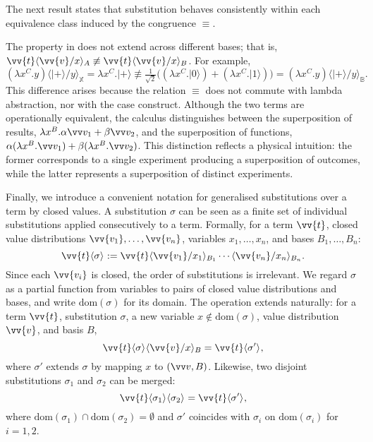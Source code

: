 \documentclass[runningheads,orivec,envcountsame,envcountsect]{llncs}
\providecommand{\qed}{\hbox{\rule{1ex}{1ex}}}%
\newcommand\ket[1]{\ensuremath{|#1\rangle}}
\newcommand\ansubst[2]{\ensuremath{\langle #1 \rangle_{#2}}}
\newcommand\dom[1]{\mathrm{dom}(#1)}
\def\Lam#1#2#3{\lambda#1^{#2}{.}#3} %
\newcommand\B{\mathbb B}
\newcommand\XB{\mathbb X}
\begin{document}
The next result states that substitution behaves consistently within each
equivalence class induced by the congruence $\equiv$.


\begin{remark}
  The property in  does not extend across
  different bases; that is,
  $\vv{t}\ansubst{\vv{v}/x}{A}\not\equiv\vv{t}\ansubst{\vv{v}/x}{B}$.
  For example,
  \[
    (\Lam{x}{C}{y})\ansubst{\ket{+}/y}{\XB}
    = \Lam{x}{C}{\ket{+}} 
    \not\equiv
    \tfrac{1}{\sqrt{2}}\big((\Lam{x}{C}{\ket{0}})
    + (\Lam{x}{C}{\ket{1}})\big)
    = (\Lam{x}{C}{y})\ansubst{\ket{+}/y}{\B}.
  \]
  This difference arises because the relation $\equiv$ does not commute with
  lambda abstraction, nor with the case construct. Although the two terms are
  operationally equivalent, the calculus distinguishes between the
  superposition of results,
  $\Lam{x}{B}{\alpha\vv v_1 + \beta\vv v_2}$,
  and the superposition of functions,
  $\alpha(\Lam{x}{B}{\vv v_1}) + \beta(\Lam{x}{B}{\vv v_2})$.
  This distinction reflects a physical intuition: the former corresponds to a
  single experiment producing a superposition of outcomes, while the latter
  represents a superposition of distinct experiments.
\end{remark}

Finally, we introduce a convenient notation for generalised substitutions over
a term by closed values. A substitution $\sigma$ can be seen as a finite set of
individual substitutions applied consecutively to a term. Formally, for a term
$\vv{t}$, closed value distributions $\vv{v_1},\dots,\vv{v_n}$, variables
$x_1,\dots,x_n$, and bases $B_1,\dots,B_n$:
\[
  \vv{t}\ansubst{\sigma}{}
  := \vv{t}\ansubst{\vv{v_1}/x_1}{B_1}\dotsb\ansubst{\vv{v_n}/x_n}{B_n}.
\]
Since each $\vv{v_i}$ is closed, the order of substitutions is irrelevant. We
regard $\sigma$ as a partial function from variables to pairs of closed value
distributions and bases, and write $\dom{\sigma}$ for its domain. The operation
extends naturally: for a term $\vv{t}$, substitution $\sigma$, a new variable
$x\notin\dom{\sigma}$, value distribution $\vv{v}$, and basis $B$,
\[
  \vv{t}\ansubst{\sigma}{}\ansubst{\vv{v}/x}{B}
  = \vv{t}\ansubst{\sigma'}{},
\]
where $\sigma'$ extends $\sigma$ by mapping $x$ to $(\vv v,B)$. Likewise, two
disjoint substitutions $\sigma_1$ and $\sigma_2$ can be merged:
\[
  \vv{t}\ansubst{\sigma_1}{}\ansubst{\sigma_2}{}
  = \vv{t}\ansubst{\sigma'}{},
\]
where $\dom{\sigma_1}\cap\dom{\sigma_2}=\emptyset$ and $\sigma'$ coincides with
$\sigma_i$ on $\dom{\sigma_i}$ for $i=1,2$.
\end{document}
